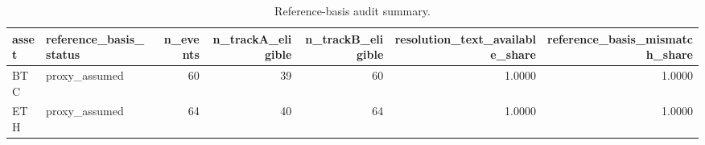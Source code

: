 \begin{table}
\caption{Reference-basis audit summary.}
\label{tab:reference_basis_audit_summary}
\begin{tabular}{llrrrrr}
\toprule
asset & reference\_basis\_status & n\_events & n\_trackA\_eligible & n\_trackB\_eligible & resolution\_text\_available\_share & reference\_basis\_mismatch\_share \\
\midrule
BTC & proxy\_assumed & 60 & 39 & 60 & 1.0000 & 1.0000 \\
ETH & proxy\_assumed & 64 & 40 & 64 & 1.0000 & 1.0000 \\
\bottomrule
\end{tabular}
\end{table}
